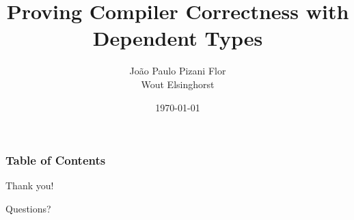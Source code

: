 \documentclass{beamer}
\title[Compiler Correctness]{Proving Compiler Correctness with Dependent Types}
\date{\today}
\author[J. P. Pizani Flor, W. Elsignhorst]{
    João Paulo Pizani Flor \\
    Wout Elsinghorst
}
\institute[Utrecht University] {
    Department of Information and Computing Sciences \\
    Utrecht University
}
\begin{document}
    \begin{frame}
        \titlepage
    \end{frame}

    \begin{frame}
        \frametitle{Table of Contents}
        \tableofcontents
    \end{frame}


    
    
    


    \begin{frame}[plain]
        \begin{center}
            \par{\Huge{Thank you!}}
            \vspace{2.0cm}
            \par{\Huge{Questions?}}
        \end{center}
    \end{frame}
\end{document}

